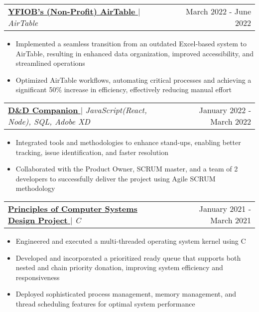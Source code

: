 \documentclass[a4paper,11pt]{article}
\makeatletter
\newcommand{\myuline}[1]{%
  \uline{#1}%
}
\newcommand{\resumeItem}[1]{
  \item\small{
    {#1 \vspace{-3pt}}
  }
}
\newcommand{\resumeProjectHeading}[2]{
    \vspace{-2pt} %
    \item
    \begin{tabular*}{0.97\textwidth}{l@{\extracolsep{\fill}}r}
      \small#1 & #2 \\
    \end{tabular*} \vspace{-15.6pt} %
}
\newcommand{\resumeItemListStart}{\begin{itemize}}
\newcommand{\resumeItemListEnd}{\end{itemize}\vspace{-6pt}} %
\makeatother
\begin{document}
     \resumeProjectHeading 
          {\href{https://github.com/ChristyYuen}{\myuline{\textbf{YFIOB’s (Non-Profit) AirTable}}} $|$ \textit{AirTable}}{March 2022 - June 2022}
          \resumeItemListStart
            \resumeItem{Implemented a seamless transition from an outdated Excel-based system to AirTable, resulting in enhanced data organization, improved accessibility, and streamlined operations}
            \resumeItem{Optimized AirTable workflows, automating critical processes and achieving a significant 50$\%$ increase in efficiency, effectively reducing manual effort}
          \resumeItemListEnd
      \resumeProjectHeading
          {\href{https://github.com/ChristyYuen}{\myuline{\textbf{D\&D Companion}}} $|$ \textit{JavaScript(React, Node), SQL, Adobe XD}}{January 2022 - March 2022}
          \resumeItemListStart
            \resumeItem{Integrated tools and methodologies to enhance stand-ups, enabling better tracking, issue identification, and faster resolution}
            \resumeItem{Collaborated with the Product Owner, SCRUM master, and a team of 2 developers to successfully deliver the project using Agile SCRUM methodology}
          \resumeItemListEnd   
      \resumeProjectHeading 
          {\href{https://github.com/ChristyYuen}{\myuline{\textbf{Principles of Computer Systems Design Project}}} $|$ \textit{C}}{January 2021 - March 2021}
          \resumeItemListStart
            \resumeItem{Engineered and executed a multi-threaded operating system kernel using C}
            \resumeItem{Developed and incorporated a prioritized ready queue that supports both nested and chain priority donation, improving system efficiency and responsiveness}
             \resumeItem{Deployed sophisticated process management, memory management, and thread scheduling features for optimal system performance}
          \resumeItemListEnd
\end{document}
